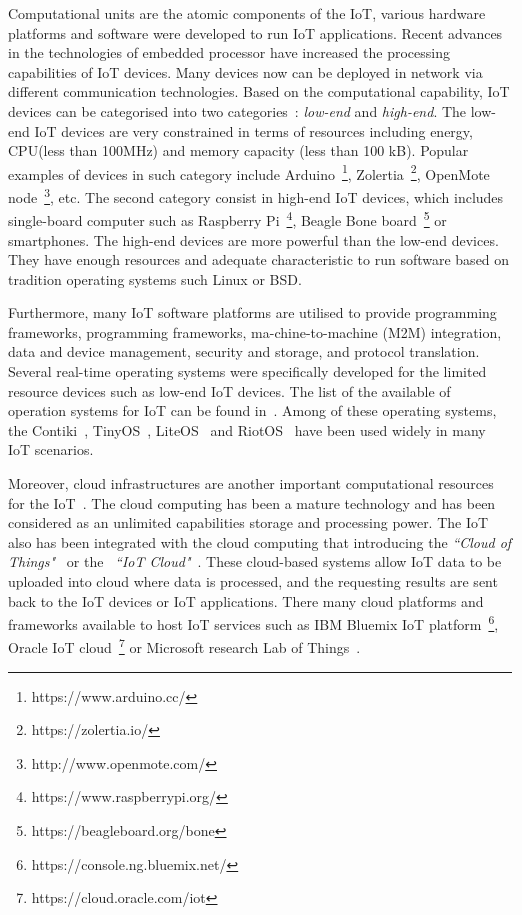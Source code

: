 Computational units are the atomic components of the IoT, various hardware platforms and software were developed to run IoT applications. 
Recent advances in the technologies of embedded processor have increased the processing capabilities of IoT devices.
Many devices now can be deployed in network via different communication technologies.
Based on the computational capability, IoT devices can be categorised into two categories~\citep{Hahm:2016}: \textit{low-end}  and \textit{high-end}.
The low-end IoT devices are very constrained in terms of resources including energy, CPU(less than 100MHz) and memory capacity (less than 100 kB).
Popular examples of devices in such category include 
Arduino~\footnote{https://www.arduino.cc/}, 
Zolertia~\footnote{https://zolertia.io/}, 
OpenMote node~\footnote{http://www.openmote.com/}, etc.
The second category consist in high-end IoT devices, which includes single-board computer such as Raspberry Pi~\footnote{https://www.raspberrypi.org/}, 
Beagle Bone board~\footnote{https://beagleboard.org/bone} or 
smartphones.
The high-end devices are more powerful than the low-end devices.
They have enough resources and adequate characteristic to run software based on tradition operating systems such Linux or BSD. 


Furthermore, many IoT software platforms are utilised to provide programming frameworks, programming frameworks, ma-chine-to-machine (M2M) integration, data and device management, security and storage, and protocol translation. 
Several real-time operating systems were specifically developed for the limited resource devices such as low-end IoT devices.
The list of the available of operation systems for IoT can be found in~\citep{Hahm:2016}.
Among of these operating systems, the Contiki~\citep{Biljana:2017}, TinyOS~\citep{Amjad:2016}, LiteOS~\citep{Vanitha:2010} and RiotOS~\citep{Baccelli:2013} have been used widely in many IoT scenarios. 


Moreover, cloud infrastructures are another important computational resources for the IoT~\citep{Botta:2016}.
The cloud computing has been a mature technology and has been considered as an unlimited capabilities storage and processing power.
The IoT also has been integrated with the cloud computing that introducing the \textit{``Cloud of Things"}~\citep{Jiehan:2013} or the ~\textit{``IoT Cloud"}~\citep{Truong:2015}.
These cloud-based systems allow IoT data to be uploaded into cloud where data is processed, and the requesting results are sent back to the IoT devices or IoT applications.
There many cloud platforms and frameworks available to host IoT services such as IBM Bluemix IoT platform~\footnote{https://console.ng.bluemix.net/}, Oracle IoT cloud~\footnote{https://cloud.oracle.com/iot} or Microsoft research Lab of Things~\citep{Brush:2013}.

